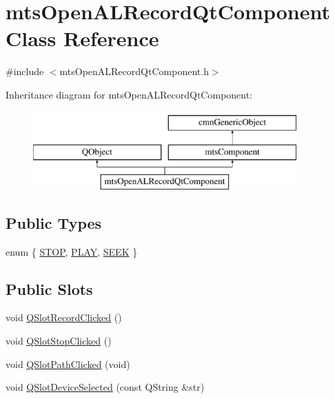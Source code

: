 \hypertarget{classmts_open_a_l_record_qt_component}{\section{mts\-Open\-A\-L\-Record\-Qt\-Component Class Reference}
\label{classmts_open_a_l_record_qt_component}
}


{\ttfamily \#include $<$mts\-Open\-A\-L\-Record\-Qt\-Component.\-h$>$}

Inheritance diagram for mts\-Open\-A\-L\-Record\-Qt\-Component\-:\begin{figure}[H]
\begin{center}
\leavevmode
\includegraphics[height=3.000000cm]{df/d6e/classmts_open_a_l_record_qt_component}
\end{center}
\end{figure}
\subsection*{Public Types}
\begin{DoxyCompactItemize}
\item 
enum \{ \hyperlink{classmts_open_a_l_record_qt_component_ac1f412b23048df3a9dc932212ae81140a99e61abeea3225d5e94838d7a4cbaec0}{S\-T\-O\-P}, 
\hyperlink{classmts_open_a_l_record_qt_component_ac1f412b23048df3a9dc932212ae81140a9df9a56914ab643a6090f45bf69ae4de}{P\-L\-A\-Y}, 
\hyperlink{classmts_open_a_l_record_qt_component_ac1f412b23048df3a9dc932212ae81140af560d9d300c83662810c23ed8d2ee157}{S\-E\-E\-K}
 \}
\end{DoxyCompactItemize}
\subsection*{Public Slots}
\begin{DoxyCompactItemize}
\item 
void \hyperlink{classmts_open_a_l_record_qt_component_a9448468a4757b06d8dfc64d9d4bc1b10}{Q\-Slot\-Record\-Clicked} ()
\item 
void \hyperlink{classmts_open_a_l_record_qt_component_a1552a618032b23f9f8bb62ff88900cca}{Q\-Slot\-Stop\-Clicked} ()
\item 
void \hyperlink{classmts_open_a_l_record_qt_component_a89b972bc566a4b77be2da755af094f28}{Q\-Slot\-Path\-Clicked} (void)
\item 
void \hyperlink{classmts_open_a_l_record_qt_component_a1bcae70d87259df76c38aedefc443fbf}{Q\-Slot\-Device\-Selected} (const Q\-String \&str)
\end{DoxyCompactItemize}
